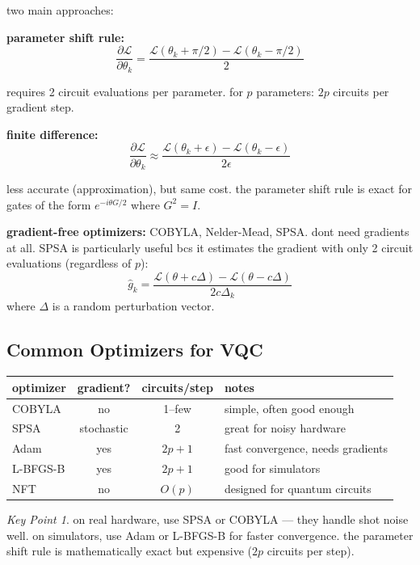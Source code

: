 \documentclass[11pt,a4paper]{article}
\theoremstyle{definition}
\theoremstyle{remark}
\newtheorem*{keypoint}{Key Point}
\begin{document}
two main approaches:

\textbf{parameter shift rule:}
\[
\frac{\partial \mathcal{L}}{\partial \theta_k} = \frac{\mathcal{L}(\theta_k + \pi/2) - \mathcal{L}(\theta_k - \pi/2)}{2}
\]

requires 2 circuit evaluations per parameter. for $p$ parameters: $2p$ circuits per gradient step.

\textbf{finite difference:}
\[
\frac{\partial \mathcal{L}}{\partial \theta_k} \approx \frac{\mathcal{L}(\theta_k + \epsilon) - \mathcal{L}(\theta_k - \epsilon)}{2\epsilon}
\]

less accurate (approximation), but same cost. the parameter shift rule is exact for gates of the form $e^{-i\theta G/2}$ where $G^2 = I$.

\textbf{gradient-free optimizers:}
COBYLA, Nelder-Mead, SPSA. dont need gradients at all. SPSA is particularly useful bcs it estimates the gradient with only 2 circuit evaluations (regardless of $p$):
\[
\hat{g}_k = \frac{\mathcal{L}(\theta + c\Delta) - \mathcal{L}(\theta - c\Delta)}{2c\Delta_k}
\]
where $\Delta$ is a random perturbation vector.

\subsection{Common Optimizers for VQC}

\begin{center}
\begin{tabular}{l|c|c|l}
\textbf{optimizer} & \textbf{gradient?} & \textbf{circuits/step} & \textbf{notes} \\
\hline
COBYLA & no & 1--few & simple, often good enough \\
SPSA & stochastic & 2 & great for noisy hardware \\
Adam & yes & $2p + 1$ & fast convergence, needs gradients \\
L-BFGS-B & yes & $2p + 1$ & good for simulators \\
NFT & no & $O(p)$ & designed for quantum circuits
\end{tabular}
\end{center}

\begin{keypoint}
on real hardware, use SPSA or COBYLA --- they handle shot noise well. on simulators, use Adam or L-BFGS-B for faster convergence. the parameter shift rule is mathematically exact but expensive ($2p$ circuits per step).
\end{keypoint}
\end{document}
